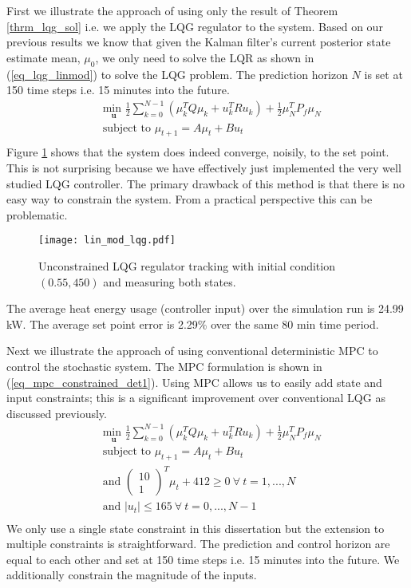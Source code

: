 First we illustrate the approach of using only the result of Theorem \ref{thrm_lqg_sol} i.e. we apply the LQG regulator to the system. Based on our previous results we know that given the Kalman filter's current posterior state estimate mean, $\mu_0$, we only need to solve the LQR as shown in (\ref{eq_lqg_linmod}) to solve the LQG problem. The prediction horizon $N$ is set at 150 time steps i.e. 15 minutes into the future. 
\begin{equation}
\begin{aligned}
&\underset{\mathbf{u}}{\text{min }} \frac{1}{2}\sum_{k=0}^{N-1} \left( \mu_k^TQ\mu_k + u_k^TRu_k \right) + \frac{1}{2}\mu_N^TP_f\mu_N \\
& \text{subject to } \mu_{t+1}=A\mu_t + Bu_t \\
\end{aligned}
\label{eq_lqg_linmod}
\end{equation}
Figure \ref{fig_lin_mod_lqg} shows that the system does indeed converge, noisily, to the set point. This is not surprising because we have effectively just implemented the very well studied LQG controller. The primary drawback of this method is that there is no easy way to constrain the system. From a practical perspective this can be problematic. 
\begin{figure}[H] 
\centering
\texttt{[image: lin\_mod\_lqg.pdf]}
\caption{Unconstrained LQG regulator tracking with initial condition $(0.55, 450)$ and measuring both states.}
\label{fig_lin_mod_lqg}
\end{figure}
The average heat energy usage (controller input) over the simulation run is 24.99 kW. The average set point error is 2.29\% over the same 80 min time period.
 
Next we illustrate the approach of using conventional deterministic MPC to control the stochastic system. The MPC formulation is shown in (\ref{eq_mpc_constrained_det1}). Using MPC allows us to easily add state and input constraints; this is a significant improvement over conventional LQG as discussed previously.
\begin{equation}
\begin{aligned}
&\underset{\mathbf{u}}{\text{min }} \frac{1}{2}\sum_{k=0}^{N-1} \left( \mu_k^TQ\mu_k + u_k^TRu_k \right) + \frac{1}{2}\mu_N^TP_f\mu_N \\
& \text{subject to } \mu_{t+1}=A\mu_t + Bu_t \\
&\text{and } \begin{pmatrix}
10 \\ 1
\end{pmatrix}^T \mu_t + 412 \geq 0 ~\forall ~t=1,...,N\\
& \text{and } |u_t| \leq 165 ~\forall ~t=0,...,N-1\\
\end{aligned}
\label{eq_mpc_constrained_det1}
\end{equation}
We only use a single state constraint in this dissertation but the extension to multiple constraints is straightforward. The prediction and control horizon are equal to each other and set at 150 time steps i.e. 15 minutes into the future. We additionally constrain the magnitude of the inputs.

